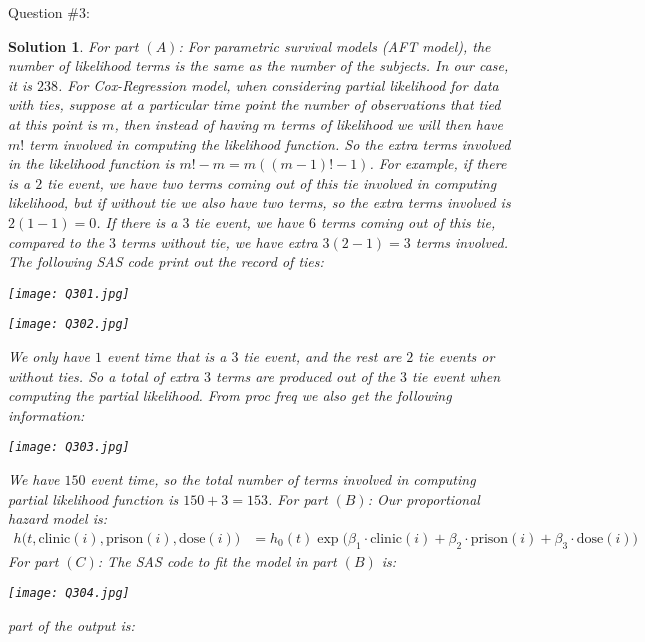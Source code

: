 \documentclass[11pt]{article}
\newtheorem{sol}{Solution}
\begin{document}
Question $\#3$:
\begin{sol}
	For part $(A)$:\vskip 2mm
	For parametric survival models (AFT model), the number of likelihood terms is the same as the number of the subjects. In our case, it is $238$.\vskip 2mm
	For Cox-Regression model, when considering partial likelihood for data with ties, suppose at a particular time point the number of observations that tied at this point is $m$, then instead of having $m$ terms of likelihood we will then have $m!$ term involved in computing the likelihood function. So the extra terms involved in the likelihood function is $m! - m = m((m-1)! - 1)$.\vskip 2mm
	For example, if there is a $2$ tie event, we have two terms coming out of this tie involved in computing likelihood, but if without tie we also have two terms, so the extra terms involved is $2(1 - 1)= 0$. If there is a $3$ tie event, we have $6$ terms coming out of this tie, compared to the $3$ terms without tie, we have extra $3(2 - 1) = 3$ terms involved. \vskip 2mm
	The following SAS code print out the record of ties:
	\begin{center}
		\texttt{[image: Q301.jpg]}
	\end{center}
	\begin{center}
		\texttt{[image: Q302.jpg]}
	\end{center}
	We only have $1$ event time that is a $3$ tie event, and the rest are $2$ tie events or without ties. So a total of extra $3$ terms are produced out of the $3$ tie event when computing the partial likelihood.\vskip 2mm
	From proc freq we also get the following information:
	\begin{center}
		\texttt{[image: Q303.jpg]}
	\end{center}
	We have $150$ event time, so the total number of terms involved in computing partial likelihood function is $150 + 3 = 153$.
	\vskip 2mm
	For part $(B)$:\vskip 2mm
	Our proportional hazard model is:
	\begin{align*}
		h\Big(t, \text{clinic}(i), \text{prison}(i), \text{dose}(i)\Big) &= h_0(t) \exp\Big(\beta_1\cdot \text{clinic}(i)  +\beta_2 \cdot \text{prison}(i) + \beta_3\cdot \text{dose}(i)\Big)
	\end{align*}
	For part $(C)$:\vskip 2mm
	The SAS code to fit the model in part $(B)$ is:
	\begin{center}
		\texttt{[image: Q304.jpg]}
	\end{center}
	part of the output is:
	\begin{center}

\end{center}
\end{sol}
\end{document}
